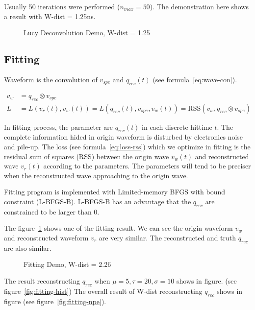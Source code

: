 Usually 50 iterations were performed ($n_{max}=50$). The demonstration here shows a result with W-dist = 1.25ns. 

\begin{figure}[H]
    \centering
    \scalebox{0.4}{}
    \caption{Lucy Deconvolution Demo, W-dist = 1.25}
\end{figure}

\subsection{Fitting}

Waveform is the convolution of $v_{spe}$ and $q_{rec}(t)$ (see formula~\eqref{eq:wave-con}). 

\begin{align}
    v_{w} &= q_{rec} \otimes v_{spe} \label{eq:wave-con} \\
    L &= L(v_{r}(t), v_{w}(t)) = L(q_{rec}(t), v_{spe}, v_{w}(t)) = \mathrm{RSS}(v_{w}, q_{rec} \otimes v_{spe}) \label{eq:loss-rss}
\end{align}

In fitting process, the parameter are $q_{rec}(t)$ in each discrete hittime $t$. The complete information hided in origin waveform is disturbed by electronics noise and pile-up. The loss (see formula~\ref{eq:loss-rss}) which we optimize in fitting is the residual sum of squares (RSS) between the origin wave $v_{w}(t)$ and reconstructed wave $v_{r}(t)$ according to the parameters. The parameters will tend to be preciser when the reconstructed wave approaching to the origin wave. 

Fitting program is implemented with Limited-memory BFGS with bound constraint \cite{byrd_limited_1995} (L-BFGS-B). L-BFGS-B has an advantage that the $q_{rec}$ are constrained to be larger than 0. 

The figure~\ref{fig:fitting} shows one of the fitting result. We can see the origin waveform $v_{w}$ and reconstructed waveform $v_{r}$ are very similar. The reconstructed and truth $q_{rec}$ are also similar. 

\begin{figure}[H]
    \centering
    \scalebox{0.4}{}
    \caption{\label{fig:fitting} Fitting Demo, W-dist = 2.26}
\end{figure}

The result reconstructing $q_{rec}$ when $\mu=5, \tau=20, \sigma=10$ shows in figure. (see figure~\ref{fig:fitting-hist}) The overall result of W-dist reconstructing $q_{rec}$ shows in figure (see figure~\ref{fig:fitting-npe}). 

